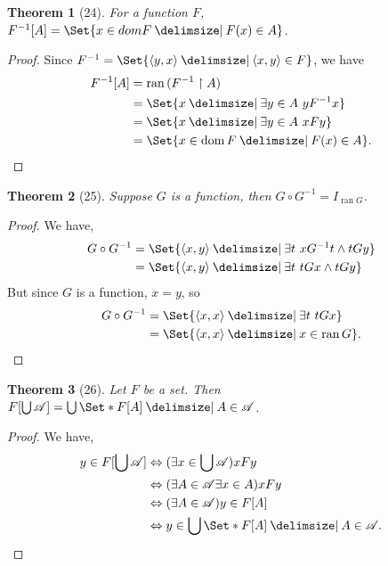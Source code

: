 \documentclass[12pt]{article}
\theoremstyle{plain}
\newtheorem*{exthm}{Theorem}
\theoremstyle{remark}
\theoremstyle{definition}
\theoremstyle{remark}
\providecommand\st{}
\newcommand\SetSymbol[1][]{%
  \nonscript\:#1\vert%
  \allowbreak%
  \nonscript\:
\mathopen{}}
\DeclarePairedDelimiter{\ang}{\langle}{\rangle}
\renewcommand\st{\SetSymbol[\delimsize]}
\renewcommand{\iff}{\Leftrightarrow}
\DeclareMathOperator{\dom}{dom}
\DeclareMathOperator{\ran}{ran}
\begin{document}
\begin{exthm}[24]
  For a function $F$, $F^{-1}[A] = \Set{x \in dom{F} \st F(x) \in A}$.
\end{exthm}
\begin{proof}
  Since $F^{-1} = \Set{\ang{y,x} \st \ang{x, y} \in F}$, we have
  \begin{align*}
    F^{-1}[A] &= \ran{(F^{-1} \restriction A)}\\
              &= \Set{x \st \exists y \in A\ y F^{-1} x}\\
              &= \Set{x \st \exists y \in A\ x F y}\\
              &= \Set{x \in \dom{F} \st F(x) \in A}.
  \end{align*}
\end{proof}

\begin{exthm}[25]
  Suppose $G$ is a function, then $G \circ G^{-1} = I_{\ran{G}}$.
\end{exthm}
\begin{proof}
  We have,
  \begin{align*}
    G \circ G^{-1} &= \Set{\ang{x,y} \st \exists t\ x G^{-1} t \land tGy}\\
                   &= \Set{\ang{x,y} \st \exists t\ tGx \land tGy}
  \end{align*}
  But since $G$ is a function, $x = y$, so
  \begin{align*}
    G \circ G^{-1} &= \Set{\ang{x,x} \st \exists t\ tGx}\\
                   &= \Set{\ang{x,x} \st x \in \ran{G}}.
  \end{align*}
\end{proof}

\begin{exthm}[26]
  Let $F$ be a set. Then $F[\bigcup \mathscr{A}] = \bigcup \Set*{F[A] \st A \in \mathscr{A}}$.
\end{exthm}
\begin{proof}
  We have,
  \begin{align*}
    y \in F[\bigcup \mathscr{A}] &\iff (\exists x \in \bigcup \mathscr{A}) xFy\\
                                 &\iff (\exists A \in \mathscr{A} \exists x \in A) xFy\\
                                 &\iff (\exists A \in \mathscr{A}) y \in F[A]\\
                                 &\iff y \in \bigcup \Set*{F[A] \st A \in \mathscr{A}}.
  \end{align*}
\end{proof}
\end{document}
